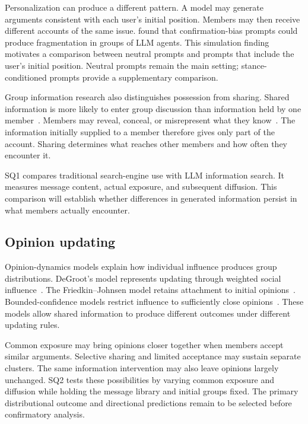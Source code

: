 \documentclass[11pt,a4paper]{article}
\begin{document}
Personalization can produce a different pattern. A model may generate arguments consistent with each user's initial position. Members may then receive different accounts of the same issue. \citet{chuang2024} found that confirmation-bias prompts could produce fragmentation in groups of LLM agents. This simulation finding motivates a comparison between neutral prompts and prompts that include the user's initial position. Neutral prompts remain the main setting; stance-conditioned prompts provide a supplementary comparison.

Group information research also distinguishes possession from sharing. Shared information is more likely to enter group discussion than information held by one member~\citep{stasser1985}. Members may reveal, conceal, or misrepresent what they know~\citep{steinel2010}. The information initially supplied to a member therefore gives only part of the account. Sharing determines what reaches other members and how often they encounter it.

SQ1 compares traditional search-engine use with LLM information search. It measures message content, actual exposure, and subsequent diffusion. This comparison will establish whether differences in generated information persist in what members actually encounter.

\subsection{Opinion updating}

Opinion-dynamics models explain how individual influence produces group distributions. DeGroot's model represents updating through weighted social influence~\citep{degroot1974}. The Friedkin--Johnsen model retains attachment to initial opinions~\citep{friedkin1990}. Bounded-confidence models restrict influence to sufficiently close opinions~\citep{hegselmann2002}. These models allow shared information to produce different outcomes under different updating rules.

Common exposure may bring opinions closer together when members accept similar arguments. Selective sharing and limited acceptance may sustain separate clusters. The same information intervention may also leave opinions largely unchanged. SQ2 tests these possibilities by varying common exposure and diffusion while holding the message library and initial groups fixed. The primary distributional outcome and directional predictions remain to be selected before confirmatory analysis.
\end{document}
